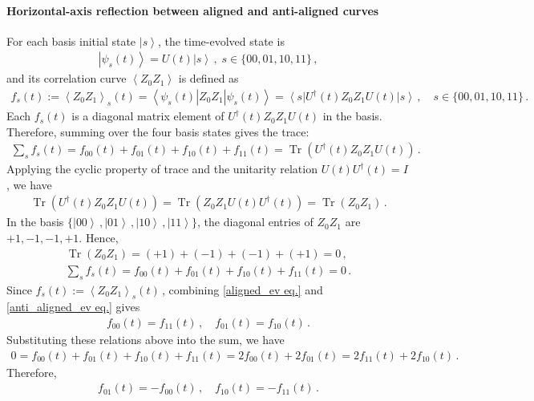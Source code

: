 \documentclass[11pt]{article}
\numberwithin{equation}{section}
\newcommand{\bra}[1]{\left\langle #1 \right|} %
\newcommand{\ket}[1]{\left| #1 \right\rangle} %
\newcommand{\ev}[1]{\left\langle #1 \right\rangle} %
\begin{document}
\paragraph{Horizontal-axis reflection between aligned and anti-aligned curves}
For each basis initial state $\ket{s}$, the time-evolved state is
\begin{align*}
  \ket{\psi_s(t)} = U(t)\ket{s} \,, \; s \in \{00,01,10,11\} \,,
\end{align*}
and its correlation curve $\ev{Z_0Z_1}$ is defined as
\begin{align*}
  f_s(t) := \ev{Z_0Z_1}_{s}(t) = \bra{\psi_s(t)} Z_0Z_1 \ket{\psi_s(t)} = \bra{s} U^\dagger(t) Z_0Z_1U(t) \ket{s} \,, \quad s \in \{00,01,10,11\} \,.
\end{align*}
Each $f_s(t)$ is a diagonal matrix element of $U^\dagger(t)Z_0Z_1U(t)$ in the basis. Therefore, summing over the four basis states gives the trace:
\begin{align*}
  \sum_s f_s(t) = f_{00}(t) + f_{01}(t) + f_{10}(t) + f_{11}(t) = \operatorname{Tr} \left( U^\dagger(t) Z_0Z_1U(t) \right) \,.
\end{align*}
Applying the cyclic property of trace and the unitarity relation $U(t) U^\dagger(t) = I$, we have
\begin{align*}
  \operatorname{Tr} \left(U^\dagger(t)Z_0Z_1U(t)\right) = \operatorname{Tr} \left(Z_0Z_1 U(t) U^\dagger(t) \right) = \operatorname{Tr}(Z_0Z_1) \,.
\end{align*}
In the basis $\{\ket{00}\,,\ket{01}\,,\ket{10}\,,\ket{11}\}$, the diagonal entries of $Z_0Z_1$ are $+1 , -1 , -1 , +1$. Hence,
\begin{align*}
  \operatorname{Tr} (Z_0Z_1) = (+1) + (-1) + (-1) + (+1) = 0 \,,\\
  \sum_s f_s(t) = f_{00}(t) + f_{01}(t) + f_{10}(t) + f_{11}(t) = 0 \,.
\end{align*}
Since $f_s(t) := \ev{Z_0Z_1}_{s}(t)$\,, combining \eqref{aligned_ev eq.} and \eqref{anti_aligned_ev eq.} gives
\begin{align*}
  f_{00}(t) = f_{11}(t) \,, \quad f_{01}(t) = f_{10}(t) \,.
\end{align*}
Substituting these relations above into the sum, we have
\begin{align*}
  0 = f_{00}(t) + f_{01}(t) + f_{10}(t) + f_{11}(t) = 2f_{00}(t) + 2f_{01}(t) = 2f_{11}(t) + 2f_{10}(t)\,.
\end{align*}
Therefore,
\begin{align*}
  f_{01}(t) = -f_{00}(t) \,, \quad f_{10}(t) = -f_{11}(t) \,.
\end{align*}
\end{document}
